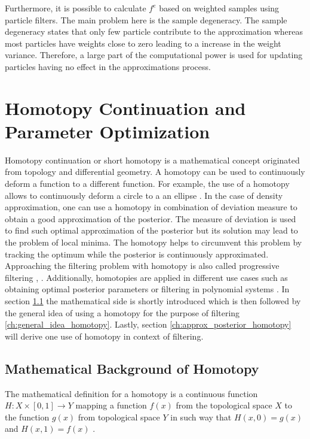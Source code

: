 \documentclass[a4paper]{IEEEtran}
\begin{document}
Furthermore, it is possible to calculate $f^{e}$ based on weighted samples using particle filters. The main problem here is the sample degeneracy. The sample degeneracy states that only few particle contribute to the approximation whereas most particles 
have weights close to zero \cite{arulampalam2002} leading to a increase in the weight variance. Therefore, a large part of the computational power is used for updating particles having no effect in the approximations process.


\section{Homotopy Continuation and Parameter Optimization}
\label{ch:homotopy_continuation}

Homotopy continuation or short homotopy is a mathematical concept originated from topology and differential geometry. A homotopy can be used to continuously deform a function to a different function. For example, the use of a homotopy allows to continuously deform a
circle to a an ellipse \cite{liao2012}. In the case of density approximation, one can use a homotopy in combination of deviation measure to obtain a good approximation of the posterior. The measure of deviation is used to find such optimal approximation of the posterior but its solution may lead to the problem of local minima.
The homotopy helps to circumvent this problem by tracking the optimum while the posterior is continuously approximated.
Approaching the filtering problem with homotopy is also called progressive filtering \cite{hanebeck2003}, \cite{hanebeck2012a}. Additionally, homotopies are applied in different use cases such as obtaining optimal posterior parameters \cite{hagmar2011} or filtering in polynomial systems \cite{huber}.
In section \ref{ch:math_background_homotopy} the mathematical side is shortly introduced which is then followed by the general idea of using a homotopy for the purpose of filtering \ref{ch:general_idea_homotopy}. 
Lastly, section \ref{ch:approx_posterior_homotopy} will derive one use of homotopy in context of filtering.

\subsection{Mathematical Background of Homotopy}
\label{ch:math_background_homotopy}
The mathematical definition for a homotopy is a continuous function $H:X \times [0,1] \rightarrow Y$ mapping a function $f(x)$ from the topological space $X$ to the function $g(x)$ from topological space $Y$ in such way 
that $H(x,0)=g(x)$ and $H(x,1)=f(x)$ \cite{liao2012}. 
\end{document}
